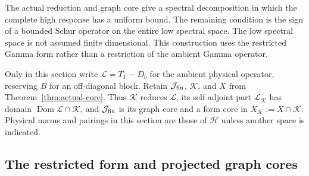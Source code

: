 \documentclass[11pt,a4paper]{article}
\numberwithin{equation}{section}
\theoremstyle{definition}\newtheorem{definition}[theorem]{Definition}
\theoremstyle{remark}\newtheorem{remark}[theorem]{Remark}
\newcommand{\Hh}{\mathcal H}\newcommand{\Hw}{\mathcal H}
\newcommand{\dom}{\operatorname{Dom}}\newcommand{\Var}{\operatorname{Var}}
\newcommand{\Kk}{\mathcal K}\newcommand{\Aa}{\mathcal A}\newcommand{\Ff}{\mathcal F}
\begin{document}
The actual reduction and graph core give a spectral decomposition in which
the complete high response has a uniform bound. The remaining condition is
the sign of a bounded Schur operator on the entire low spectral space.
The low spectral space is not assumed finite dimensional. This construction
uses the restricted Gamma form rather than a restriction of the ambient
Gamma operator.

Only in this section write $\mathcal L=T_\Gamma-D_b$ for the ambient
physical operator, reserving $B$ for an off-diagonal block. Retain
$\mathcal J_{\rm fin}$, $\Kk$, and $X$ from
Theorem~\ref{thm:actual-core}. Thus $\Kk$ reduces $\mathcal L$,
its self-adjoint part $\mathcal L_\Kk$ has domain
$\dom\mathcal L\cap\Kk$, and $\mathcal J_{\rm fin}$ is its graph
core and a form core in $X_\Kk:=X\cap\Kk$.
Physical norms and pairings in this section are those of $\Hh$ unless
another space is indicated.

\subsection{The restricted form and projected graph cores}
\end{document}
